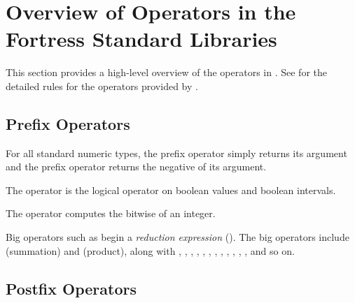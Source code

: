 %
%
%
%

\section{Overview of Operators in the Fortress Standard Libraries}


This section provides a high-level overview of the operators in
\library.
See  for the detailed rules for the operators
provided by \library.

\subsection{Prefix Operators}

For all standard numeric types, the prefix operator \EXP{+} simply returns its
argument and the prefix operator \EXP{-} returns the negative of its argument.

The operator \EXP{\neg} is the logical  operator on boolean values
and boolean intervals.

The operator \EXP{\twointersectnot} computes the bitwise  of
an integer.

Big operators such as \EXP{\sum} begin a \emph{reduction expression}
().  The big operators include \EXP{\sum}
(summation) and \EXP{\prod} (product), along with \EXP{\bigcap},
\EXP{\bigcup}, \EXP{\bigwedge}, \EXP{\bigvee},
\EXP{\underline{\bigvee}}, \EXP{\bigoplus},
\EXP{\bigotimes}, \EXP{\biguplus}, \EXP{\displaystyle\boxplus},
\EXP{\displaystyle\boxtimes}, , , and so on.

\subsection{Postfix Operators}

